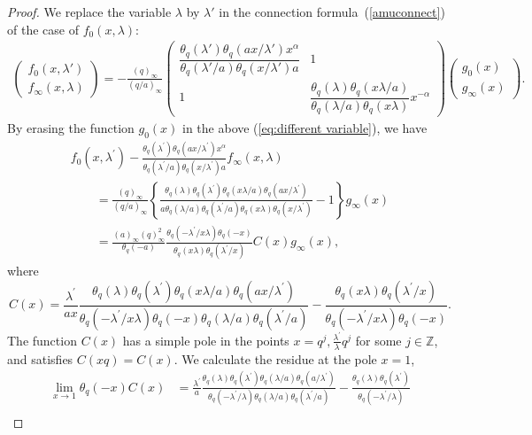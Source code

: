 \documentclass[pdftex]{sigma}
\numberwithin{equation}{section}
\theoremstyle{definition}
\newcommand{\Zz}{\mathbb{Z}}
\begin{document}
\begin{proof}
We replace the variable $\lambda$ by $\lambda'$ in the connection formula~(\ref{amuconnect}) of the case of $f_0(x,\lambda)$:
\begin{gather}
\label{eq:different variable}
\begin{pmatrix}f_0(x,\lambda')\\ f_{\infty }(x,\lambda) \end{pmatrix}=-\frac{(q)_\infty}{(q/a)_\infty}\begin{pmatrix}\dfrac{\theta_q(\lambda')\theta_q(ax/\lambda')x^\alpha}{\theta_q(\lambda'/a)\theta_q(x/\lambda')a}&1\\ 1&\dfrac{\theta_q(\lambda)\theta_q(x\lambda/a)}{\theta_q(\lambda/a)\theta_q(x\lambda)}x^{-\alpha}\end{pmatrix}\begin{pmatrix}g_0(x)\\g_\infty(x)\end{pmatrix}.
\end{gather}
By erasing the function $g_0(x)$ in the above (\ref{eq:different variable}), we have
\begin{gather*}
f_0(x,\lambda^{\prime})-\frac{\theta_q(\lambda^{\prime})\theta_q(ax/\lambda^{\prime})x^\alpha}{\theta_q(\lambda^{\prime}/a)\theta_q(x/\lambda^{\prime})a}f_{\infty}(x,\lambda)\\
\qquad=\frac{(q)_\infty}{(q/a)_\infty}\left\{\frac{\theta_q(\lambda)\theta_q(\lambda^{\prime})\theta_q(x\lambda/a)\theta_q(ax/\lambda^{\prime})}{a\theta_q(\lambda/a)\theta_q(\lambda^{\prime}/a)\theta_q(x\lambda)\theta_q(x/\lambda^{\prime})}-1\right\}g_\infty(x)\\
\qquad =\frac{(a)_\infty(q)_\infty^2}{\theta_q(-a)}\frac{\theta_q(-\lambda^{\prime}/x\lambda)\theta_q(-x)}{\theta_q(x\lambda)\theta_q(\lambda^{\prime}/x)}C(x)g_\infty(x),
\end{gather*}
where
\[
C(x)=\frac{\lambda^{\prime}}{ax}\frac{\theta_q(\lambda)\theta_q(\lambda^{\prime})\theta_q(x\lambda/a)\theta_q(ax/\lambda^{\prime})} {\theta_q(-\lambda^{\prime}/x\lambda)\theta_q(-x)\theta_q(\lambda/a)\theta_q(\lambda^{\prime}/a)}-\frac{\theta_q(x\lambda) \theta_q(\lambda^{\prime}/x)}{\theta_q(-\lambda^{\prime}/x\lambda)\theta_q(-x)}.
\]
The function $C(x)$ has a simple pole in the points $x=q^j,\frac{\lambda^{\prime}}{\lambda}q^j$ for some $j\in\Zz$, and satisfies $C(xq)=C(x)$. We calculate the residue at the pole $x=1$,
\begin{align*}
\lim_{x\to1}\theta_q(-x)C(x)&=\frac{\lambda^{\prime}}{a}\frac{\theta_q(\lambda)\theta_q (\lambda^{\prime})\theta_q(\lambda/a)\theta_q(a/\lambda^{\prime})}{\theta_q(-\lambda^{\prime}/\lambda)\theta_q(\lambda/a)\theta_q(\lambda^{\prime}/a)} -\frac{\theta_q(\lambda)\theta_q(\lambda^{\prime})}{\theta_q(-\lambda^{\prime}/\lambda)}\\

\end{align*}
\end{proof}
\end{document}
